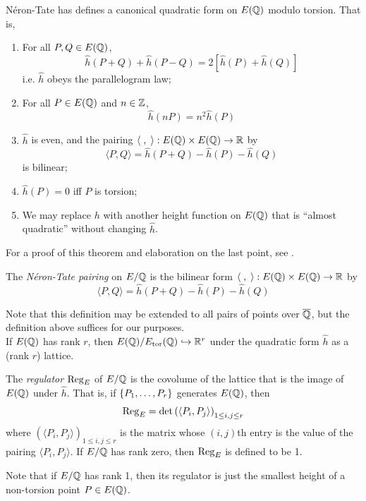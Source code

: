 \documentclass[10pt]{article}
\begin{document}
\begin{theorem}
N\'eron-Tate has defines a canonical quadratic form on $E(\mathbb{Q})$ modulo torsion. That is,
\begin{enumerate}
	\item For all $P,Q \in E(\mathbb{Q})$,
	\begin{equation}
		\hat{h}(P+Q) + \hat{h}(P-Q) = 2\left[ \hat{h}(P) + \hat{h}(Q)\right]
	\end{equation}
	i.e. $\hat{h}$ obeys the parallelogram law;
	\item For all $P \in E(\mathbb{Q})$ and $n \in \mathbb{Z}$,
	\begin{equation}
		\hat{h}(nP) = n^2 \hat{h}(P)
	\end{equation}
	\item $\hat{h}$ is even, and the pairing $\langle\;,\;\rangle: E(\mathbb{Q})\times E(\mathbb{Q}) \to \mathbb{R}$ by
	\begin{equation}
		\langle P,Q \rangle = \hat{h}(P+Q) - \hat{h}(P) - \hat{h}(Q)
	\end{equation}
	is bilinear;
	\item $\hat{h}(P) = 0$ iff $P$ is torsion;
	\item We may replace $h$ with another height function on $E(\mathbb{Q})$ that is ``almost quadratic'' without changing $\hat{h}$.
\end{enumerate}
\end{theorem}

For a proof of this theorem and elaboration on the last point, see \cite[pp. 227-232]{Sil-1985}.

\begin{definition}
The {\it N\'eron-Tate pairing} on $E/\mathbb{Q}$ is the bilinear form $\langle\;,\;\rangle: E(\mathbb{Q})\times E(\mathbb{Q}) \to \mathbb{R}$ by
	\begin{equation}
		\langle P,Q \rangle = \hat{h}(P+Q) - \hat{h}(P) - \hat{h}(Q)
	\end{equation}
\end{definition}
Note that this definition may be extended to all pairs of points over $\overline{\mathbb{Q}}$, but the definition above suffices for our purposes. \\

If $E(\mathbb{Q})$ has rank $r$, then $E(\mathbb{Q})/E_{\text{tor}}(\mathbb{Q}) \hookrightarrow \mathbb{R}^r$ under the quadratic form $\hat{h}$ as a (rank $r$) lattice.

\begin{definition}
The {\it regulator} $\operatorname{Reg}_E$ of $E/\mathbb{Q}$ is the covolume of the lattice that is the image of $E(\mathbb{Q})$ under $\hat{h}$. That is, if $\left\{P_1,\ldots,P_r\right\}$ generates $E(\mathbb{Q})$, then
\begin{equation}
	\operatorname{Reg}_E = \det\left(\langle P_i,P_j\rangle \right)_{1 \le i,j \le r}
\end{equation}
where $\left(\langle P_i,P_j\rangle \right)_{1 \le i,j \le r}$ is the matrix whose $(i,j)$th entry is the value of the pairing $\langle P_i,P_j\rangle$. If $E/\mathbb{Q}$ has rank zero, then $\operatorname{Reg}_E$ is defined to be 1.
\end{definition}
Note that if $E/\mathbb{Q}$ has rank 1, then its regulator is just the smallest height of a non-torsion point $P \in E(\mathbb{Q})$. \\
\end{document}
